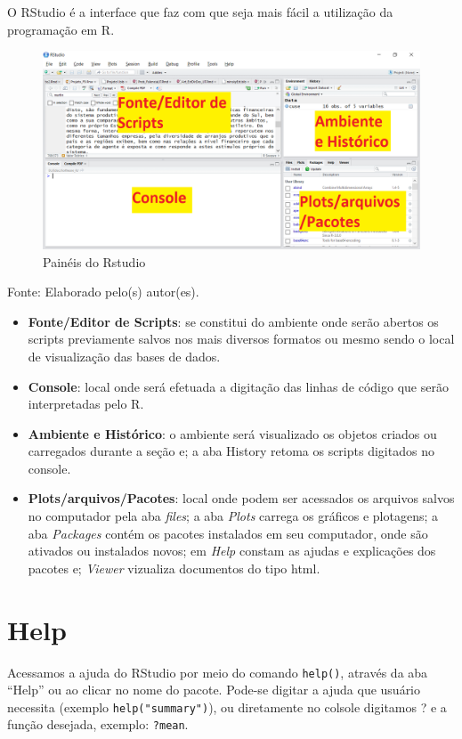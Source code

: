 \documentclass[12pt,brazil,oneside]{book}
\providecommand{\tightlist}{%
  \setlength{\itemsep}{0pt}\setlength{\parskip}{0pt}}
\begin{document}
O RStudio é a interface que faz com que seja mais fácil a utilização da
programação em R.

\begin{figure}[H]

{\centering \includegraphics[width=0.6\linewidth]{paineis} 

}

\caption{Painéis do Rstudio}\label{fig:paineis1}
\end{figure}

Fonte: Elaborado pelo(s) autor(es).

\begin{itemize}
\tightlist
\item
  \textbf{Fonte/Editor de Scripts}: se constitui do ambiente onde serão
  abertos os scripts previamente salvos nos mais diversos formatos ou
  mesmo sendo o local de visualização das bases de dados.
\item
  \textbf{Console}: local onde será efetuada a digitação das linhas de
  código que serão interpretadas pelo R.
\item
  \textbf{Ambiente e Histórico}: o ambiente será visualizado os objetos
  criados ou carregados durante a seção e; a aba History retoma os
  scripts digitados no console.
\item
  \textbf{Plots/arquivos/Pacotes}: local onde podem ser acessados os
  arquivos salvos no computador pela aba \emph{files}; a aba
  \emph{Plots} carrega os gráficos e plotagens; a aba \emph{Packages}
  contém os pacotes instalados em seu computador, onde são ativados ou
  instalados novos; em \emph{Help} constam as ajudas e explicações dos
  pacotes e; \emph{Viewer} vizualiza documentos do tipo html.
\end{itemize}

\hypertarget{help}{%
\section{Help}\label{help}}

Acessamos a ajuda do RStudio por meio do comando \texttt{help()},
através da aba ``Help'' ou ao clicar no nome do pacote. Pode-se digitar
a ajuda que usuário necessita (exemplo \texttt{help("summary")}), ou
diretamente no colsole digitamos ? e a função desejada, exemplo:
\texttt{?mean}.
\end{document}
